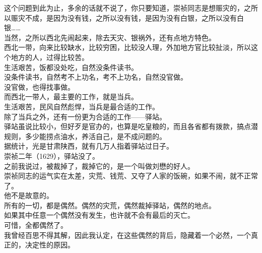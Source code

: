 \begin{multicols}{\theparacolNo}
这个问题到此为止，多余的话就不说了，你只要知道，崇祯同志是想赈灾的，之所以赈灾不成，是因为没有钱，之所以没有钱，是因为没有白银，之所以没有白银……\\

当然，之所以西北先闹起来，除去天灾、银祸外，还有点地方特色。\\

西北一带，向来比较缺水，比较穷困，比较没人理，外加地方官比较扯淡，所以这个地方的人，过得比较苦。\\

生活艰苦，饭都没处吃，自然没条件读书。\\

没条件读书，自然考不上功名，考不上功名，自然没官做。\\

没官做，也得找事做。\\

而西北一带人，最主要的工作，就是当兵。\\

生活艰苦，民风自然彪悍，当兵是最合适的工作。\\

除了当兵之外，还有一份更为合适的工作——驿站。\\

驿站虽说比较小，但好歹是官办的，也算是吃皇粮的，而且各省都有拨款，搞点潜规则，多少能捞点油水，养活自己，是不成问题的。\\

据统计，光是甘肃陕西，就有几万人指着驿站过日子。\\

崇祯二年（1629），驿站没了。\\

之前我说过，被裁掉了，裁掉它的，是一个叫做刘懋的好人。\\

崇祯同志的运气实在太差，灾荒、钱荒、又夺了人家的饭碗，如果不闹，就不正常了。\\

他不是故意的。\\

所有的一切，都是偶然。偶然的灾荒，偶然裁掉驿站，偶然的地点。\\

如果其中任意一个偶然没有发生，也许就不会有最后的灭亡。\\

可惜，全都偶然了。\\

我曾经百思不得其解，因此我认定，在这些偶然的背后，隐藏着一个必然，一个真正的，决定性的原因。\\


\end{multicols}

